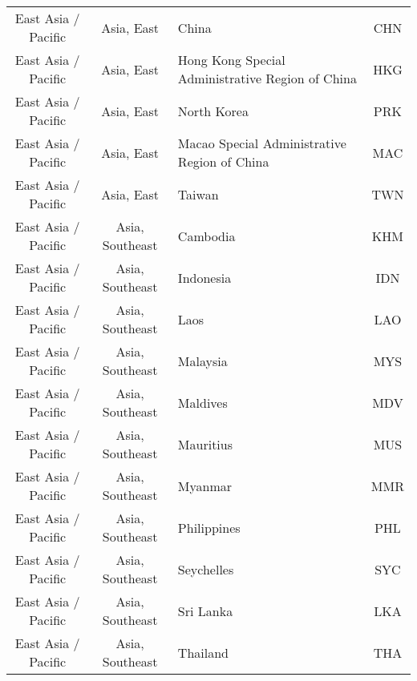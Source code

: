 \begin{landscape}
\begin{longtable}{|c|c|p{5cm}|c|}
           East Asia / Pacific &                   Asia, East &                                             China &  CHN \\
           East Asia / Pacific &                   Asia, East &  Hong Kong Special Administrative Region of China &  HKG \\
           East Asia / Pacific &                   Asia, East &                                       North Korea &  PRK \\
           East Asia / Pacific &                   Asia, East &      Macao Special Administrative Region of China &  MAC \\
           East Asia / Pacific &                   Asia, East &                                            Taiwan &  TWN \\
           East Asia / Pacific &              Asia, Southeast &                                          Cambodia &  KHM \\
           East Asia / Pacific &              Asia, Southeast &                                         Indonesia &  IDN \\
           East Asia / Pacific &              Asia, Southeast &                                              Laos &  LAO \\
           East Asia / Pacific &              Asia, Southeast &                                          Malaysia &  MYS \\
           East Asia / Pacific &              Asia, Southeast &                                          Maldives &  MDV \\
           East Asia / Pacific &              Asia, Southeast &                                         Mauritius &  MUS \\
           East Asia / Pacific &              Asia, Southeast &                                           Myanmar &  MMR \\
           East Asia / Pacific &              Asia, Southeast &                                       Philippines &  PHL \\
           East Asia / Pacific &              Asia, Southeast &                                        Seychelles &  SYC \\
           East Asia / Pacific &              Asia, Southeast &                                         Sri Lanka &  LKA \\
           East Asia / Pacific &              Asia, Southeast &                                          Thailand &  THA \\

\end{longtable}
\end{landscape}
